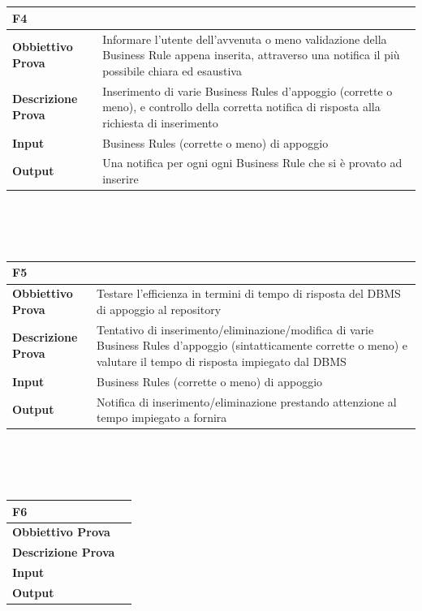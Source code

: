 \documentclass[11pt,titlepage,a4paper]{report}
\begin{document}
\\
\\
\begin{tabular}{||p{4.5cm}||p{7.5cm}||}
\hline
\textbf{\textsf{F4}}& \\
\hline
{\textbf {Obbiettivo Prova}}& Informare l'utente dell'avvenuta o meno validazione della Business Rule appena inserita, attraverso una notifica il pi\`u possibile chiara ed esaustiva\\ \hline
{\textbf{Descrizione Prova}}& Inserimento di varie Business Rules d'appoggio (corrette o meno), e controllo della corretta notifica di risposta alla richiesta di inserimento \\ \hline
{\textbf{Input}}& Business Rules (corrette o meno) di appoggio  \\ \hline
{\textbf{Output}}& Una notifica per ogni ogni Business Rule che si \`e provato ad inserire \\ \hline
\end{tabular} \\
\\
\\
\begin{tabular}{||p{4.5cm}||p{7.5cm}||}
\hline
\textbf{\textsf{F5}}& \\
\hline
{\textbf {Obbiettivo Prova}}& Testare l'efficienza in termini di tempo di risposta del DBMS di appoggio al repository\\ \hline
{\textbf{Descrizione Prova}}& Tentativo di inserimento/eliminazione/modifica di varie Business Rules d'appoggio (sintatticamente corrette o meno) e valutare il tempo di risposta impiegato dal DBMS \\ \hline
{\textbf{Input}}& Business Rules (corrette o meno) di appoggio  \\ \hline
{\textbf{Output}}& Notifica di inserimento/eliminazione prestando attenzione al tempo impiegato a fornira \\ \hline
\end{tabular} \\
\\
\\
\begin{tabular}{||p{4.5cm}||p{7.5cm}||}
\hline
\textbf{\textsf{F6}}& \\
\hline
{\textbf {Obbiettivo Prova}}& \\ \hline
{\textbf{Descrizione Prova}}&  \\ \hline
{\textbf{Input}}&  \\ \hline
{\textbf{Output}}& \\ \hline
\end{tabular} \\
\end{document}

